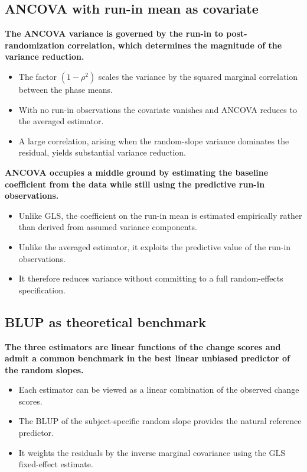 \documentclass[
  11pt,
]{article}
\begin{document}
\subsection{ANCOVA with run-in mean as covariate}\label{ancova-with-run-in-mean-as-covariate}

\textbf{The ANCOVA variance is governed by the run-in to post-randomization correlation, which determines the magnitude of the variance reduction.}

\begin{itemize}\setlength{\itemsep}{2pt}\setlength{\parskip}{0pt}
\item The factor $(1 - \rho^2)$ scales the variance by the squared marginal correlation between the phase means.
\item With no run-in observations the covariate vanishes and ANCOVA reduces to the averaged estimator.
\item A large correlation, arising when the random-slope variance dominates the residual, yields substantial variance reduction.
\end{itemize}

\textbf{ANCOVA occupies a middle ground by estimating the baseline coefficient from the data while still using the predictive run-in observations.}

\begin{itemize}\setlength{\itemsep}{2pt}\setlength{\parskip}{0pt}
\item Unlike GLS, the coefficient on the run-in mean is estimated empirically rather than derived from assumed variance components.
\item Unlike the averaged estimator, it exploits the predictive value of the run-in observations.
\item It therefore reduces variance without committing to a full random-effects specification.
\end{itemize}

\subsection{BLUP as theoretical benchmark}\label{blup-as-theoretical-benchmark}

\textbf{The three estimators are linear functions of the change scores and admit a common benchmark in the best linear unbiased predictor of the random slopes.}

\begin{itemize}\setlength{\itemsep}{2pt}\setlength{\parskip}{0pt}
\item Each estimator can be viewed as a linear combination of the observed change scores.
\item The BLUP of the subject-specific random slope provides the natural reference predictor.
\item It weights the residuals by the inverse marginal covariance using the GLS fixed-effect estimate.
\end{itemize}
\end{document}
